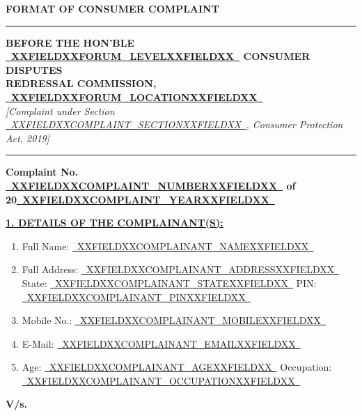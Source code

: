 \documentclass[12pt,a4paper]{article}
\newcommand{\fillline}[1]{\underline{~#1~}}
\begin{document}
\begin{center}
    {\LARGE\textbf{FORMAT OF CONSUMER COMPLAINT}}\\[0.5em]
    \rule{\linewidth}{0.8pt}
\end{center}

\vspace{0.5em}

\noindent\textbf{BEFORE THE HON'BLE \fillline{XXFIELDXXFORUM_LEVELXXFIELDXX} CONSUMER DISPUTES}\\
\textbf{REDRESSAL COMMISSION, \fillline{XXFIELDXXFORUM_LOCATIONXXFIELDXX}}\\
\textit{[Complaint under Section \fillline{XXFIELDXXCOMPLAINT_SECTIONXXFIELDXX}, Consumer Protection Act, 2019]}

\vspace{0.5em}
\rule{\linewidth}{0.4pt}

\begin{center}
    \textbf{Complaint No. \fillline{XXFIELDXXCOMPLAINT_NUMBERXXFIELDXX} of 20\fillline{XXFIELDXXCOMPLAINT_YEARXXFIELDXX}}
\end{center}

\vspace{1em}

\noindent\textbf{\uline{1. DETAILS OF THE COMPLAINANT(S):}}

\vspace{0.3em}
\begin{enumerate}[label=\Alph*., itemsep=0.5em]
    \item Full Name: \fillline{XXFIELDXXCOMPLAINANT_NAMEXXFIELDXX}
    \item Full Address: \fillline{XXFIELDXXCOMPLAINANT_ADDRESSXXFIELDXX}\\
          State: \fillline{XXFIELDXXCOMPLAINANT_STATEXXFIELDXX} \quad PIN: \fillline{XXFIELDXXCOMPLAINANT_PINXXFIELDXX}
    \item Mobile No.: \fillline{XXFIELDXXCOMPLAINANT_MOBILEXXFIELDXX}
    \item E-Mail: \fillline{XXFIELDXXCOMPLAINANT_EMAILXXFIELDXX}
    \item Age: \fillline{XXFIELDXXCOMPLAINANT_AGEXXFIELDXX} \quad Occupation: \fillline{XXFIELDXXCOMPLAINANT_OCCUPATIONXXFIELDXX}
\end{enumerate}

\vspace{1em}

\begin{center}
    \large\textbf{V/s.}
\end{center}
\end{document}
